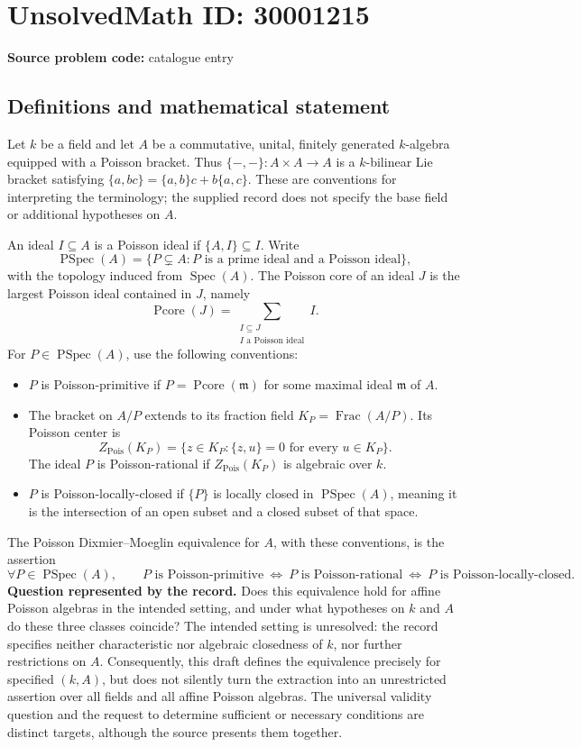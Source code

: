 \documentclass[11pt]{article}
\begin{document}
\section*{UnsolvedMath ID: 30001215}
\textbf{Source problem code:} catalogue entry
\subsection{Definitions and mathematical statement}
Let \(k\) be a field and let \(A\) be a commutative, unital, finitely generated \(k\)-algebra equipped with a Poisson bracket. Thus \(\{-,-\}:A\times A\to A\) is a \(k\)-bilinear Lie bracket satisfying \(\{a,bc\}=\{a,b\}c+b\{a,c\}\). These are conventions for interpreting the terminology; the supplied record does not specify the base field or additional hypotheses on \(A\).

An ideal \(I\subseteq A\) is a Poisson ideal if \(\{A,I\}\subseteq I\). Write
\[
\operatorname{PSpec}(A)=\{P\subsetneq A:P\text{ is a prime ideal and a Poisson ideal}\},
\]
with the topology induced from \(\operatorname{Spec}(A)\). The Poisson core of an ideal \(J\) is the largest Poisson ideal contained in \(J\), namely
\[
\operatorname{Pcore}(J)=\sum_{\substack{I\subseteq J\\ I\text{ a Poisson ideal}}}I.
\]
For \(P\in\operatorname{PSpec}(A)\), use the following conventions:
\begin{itemize}
\item \(P\) is Poisson-primitive if \(P=\operatorname{Pcore}(\mathfrak m)\) for some maximal ideal \(\mathfrak m\) of \(A\).
\item The bracket on \(A/P\) extends to its fraction field \(K_P=\operatorname{Frac}(A/P)\). Its Poisson center is
\[
Z_{\mathrm{Pois}}(K_P)=\{z\in K_P:\{z,u\}=0\text{ for every }u\in K_P\}.
\]
The ideal \(P\) is Poisson-rational if \(Z_{\mathrm{Pois}}(K_P)\) is algebraic over \(k\).
\item \(P\) is Poisson-locally-closed if \(\{P\}\) is locally closed in \(\operatorname{PSpec}(A)\), meaning it is the intersection of an open subset and a closed subset of that space.
\end{itemize}
The Poisson Dixmier--Moeglin equivalence for \(A\), with these conventions, is the assertion
\[
\forall P\in\operatorname{PSpec}(A),\qquad
P\text{ is Poisson-primitive}
\ \Longleftrightarrow\ 
P\text{ is Poisson-rational}
\ \Longleftrightarrow\ 
P\text{ is Poisson-locally-closed}.
\]
\textbf{Question represented by the record.} Does this equivalence hold for affine Poisson algebras in the intended setting, and under what hypotheses on \(k\) and \(A\) do these three classes coincide? The intended setting is unresolved: the record specifies neither characteristic nor algebraic closedness of \(k\), nor further restrictions on \(A\). Consequently, this draft defines the equivalence precisely for specified \((k,A)\), but does not silently turn the extraction into an unrestricted assertion over all fields and all affine Poisson algebras. The universal validity question and the request to determine sufficient or necessary conditions are distinct targets, although the source presents them together.
\end{document}
